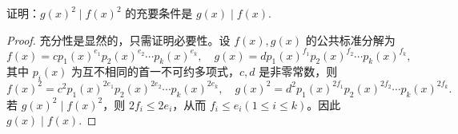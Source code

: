 \documentclass[../../main.tex]{subfiles}%
\begin{document}
\begin{proposition}[整除关系在平方下不变]\label{proposition:整除关系在平方下不变}
证明：\(g(x)^2 \mid f(x)^2\) 的充要条件是 \(g(x) \mid f(x)\).
\end{proposition}
\begin{proof}

充分性是显然的，只需证明必要性。设 \(f(x), g(x)\) 的公共标准分解为
\[
f(x) = cp_1(x)^{e_1}p_2(x)^{e_2} \cdots p_k(x)^{e_k}, \quad g(x) = dp_1(x)^{f_1}p_2(x)^{f_2} \cdots p_k(x)^{f_k},
\]
其中 \(p_i(x)\) 为互不相同的首一不可约多项式，\(c, d\) 是非零常数，则
\[
f(x)^2 = c^2 p_1(x)^{2e_1}p_2(x)^{2e_2} \cdots p_k(x)^{2e_k}, \quad g(x)^2 = d^2 p_1(x)^{2f_1}p_2(x)^{2f_2} \cdots p_k(x)^{2f_k}.
\]
若 \(g(x)^2 \mid f(x)^2\)，则 \(2f_i \leqslant  2e_i\)，从而 \(f_i \leqslant  e_i (1 \leqslant  i \leqslant  k)\)。因此 \(g(x) \mid f(x)\).

\end{proof}
\end{document}
